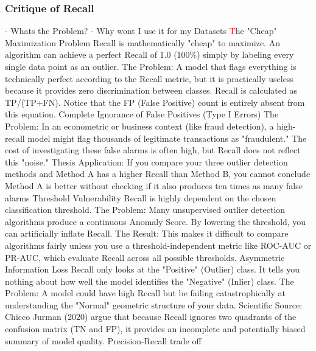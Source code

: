 \subsubsection{Critique of Recall}
    - Whats the Problem?
    - Why wont I use it for my Datasets
\textcolor{red}
    The "Cheap" Maximization Problem
    Recall is mathematically "cheap" to maximize. An algorithm can achieve a perfect Recall of 1.0 (100\%) simply by labeling every single data point as an outlier.
    The Problem: A model that flags everything is technically perfect according to the Recall metric, but it is practically useless because it provides zero discrimination between classes.
    Recall is calculated as TP/(TP+FN). Notice that the FP (False Positive) count is entirely absent from this equation.
    Complete Ignorance of False Positives (Type I Errors)
    The Problem: In an econometric or business context (like fraud detection), a high-recall model might flag thousands of legitimate transactions as "fraudulent." 
    The cost of investigating these false alarms is often high, but Recall does not reflect this "noise."
    Thesis Application: If you compare your three outlier detection methods and Method A has a higher Recall than Method B, you cannot conclude Method A is better without checking if it also produces ten times as many false alarms
    Threshold Vulnerability
    Recall is highly dependent on the chosen classification threshold.
    The Problem: Many unsupervised outlier detection algorithms produce a continuous Anomaly Score. By lowering the threshold, you can artificially inflate Recall.
    The Result: This makes it difficult to compare algorithms fairly unless you use a threshold-independent metric like ROC-AUC or PR-AUC, which evaluate Recall across all possible thresholds.
    Asymmetric Information Loss
    Recall only looks at the "Positive" (Outlier) class. It tells you nothing about how well the model identifies the "Negative" (Inlier) class.
    The Problem: A model could have high Recall but be failing catastrophically at understanding the "Normal" geometric structure of your data.
    Scientific Source: Chicco  Jurman (2020) argue that because Recall ignores two quadrants of the confusion matrix (TN and FP), it provides an incomplete and potentially biased summary of model quality.
    Precision-Recall trade off


